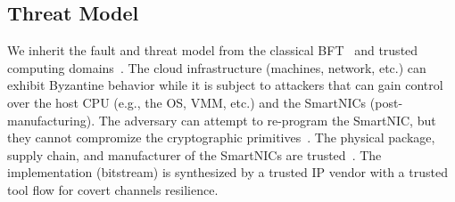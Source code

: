 




\subsection{Threat Model} We inherit the fault and threat model from the classical BFT~\cite{Castro:2002} and trusted computing domains~\cite{intel-sgx}. The cloud infrastructure (machines, network, etc.) can exhibit Byzantine behavior while it is subject to attackers that can gain control over the host CPU (e.g., the OS, VMM, etc.) and the SmartNICs (post-manufacturing). The adversary can attempt to re-program the SmartNIC, but they cannot compromize the cryptographic primitives~\cite{levin2009trinc, minBFT, Castro:2002}. The physical package, supply chain, and manufacturer of the SmartNICs are trusted~\cite{10.1145/3503222.3507733, 10.1145/2168836.2168866}. The \projecttitle{} implementation (bitstream) is synthesized by a trusted IP vendor with a trusted tool flow for covert channels resilience. %

